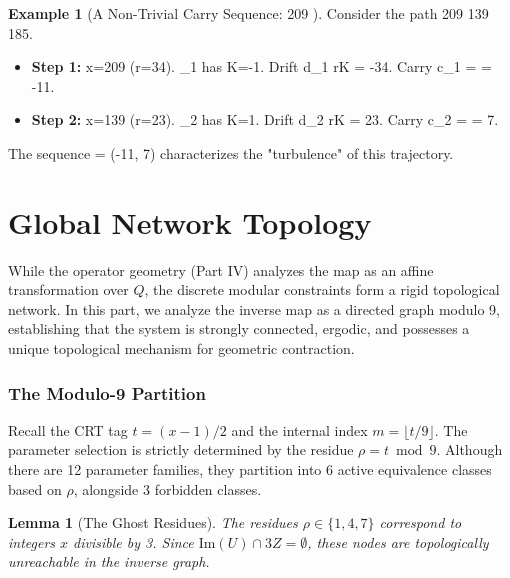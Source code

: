 \documentclass[11pt,letterpaper]{amsart}
\def\mathbb#1{#1}%
\def\({}%
\def\){}%
\theoremstyle{definition}
\newtheorem{example}{Example}
\theoremstyle{plain}
\newtheorem{lemma}{Lemma}
\theoremstyle{plain}
\theoremstyle{remark}
\begin{document}
\begin{example}[A Non-Trivial Carry Sequence: \(209 \)]
Consider the path \(209  139  185\).
\begin{itemize}
    \item \textbf{Step 1:} \(x=209\) (\(r=34\)). \(\omega_1\) has \(K=-1\).
    Drift \(d_1 \approx rK = -34\).
    Carry \(c_1 = \lfloor {} \rfloor = -11\).
    \item \textbf{Step 2:} \(x=139\) (\(r=23\)). \(\psi_2\) has \(K=1\).
    Drift \(d_2 \approx rK = 23\).
    Carry \(c_2 = \lfloor {} \rfloor = 7\).
\end{itemize}
The sequence \(\gamma = (-11, 7)\) characterizes the "turbulence" of this trajectory.
\end{example}


\part{Global Network Topology}
\label{part:network-topology}

While the operator geometry (Part IV) analyzes the map as an affine transformation over $\mathbb{Q}$, the discrete modular constraints form a rigid topological network. In this part, we analyze the inverse map as a directed graph modulo 9, establishing that the system is strongly connected, ergodic, and possesses a unique topological mechanism for geometric contraction.

\section{The Modulo-9 Partition}

Recall the CRT tag $t = (x-1)/2$ and the internal index $m = \lfloor t/9 \rfloor$. The parameter selection is strictly determined by the residue $\rho = t \bmod 9$. Although there are 12 parameter families, they partition into 6 active equivalence classes based on $\rho$, alongside 3 forbidden classes.

\begin{lemma}[The Ghost Residues]
The residues $\rho \in \{1, 4, 7\}$ correspond to integers $x$ divisible by 3. Since $\text{Im}(U) \cap 3\mathbb{Z} = \emptyset$, these nodes are topologically unreachable in the inverse graph.
\end{lemma}
\end{document}
